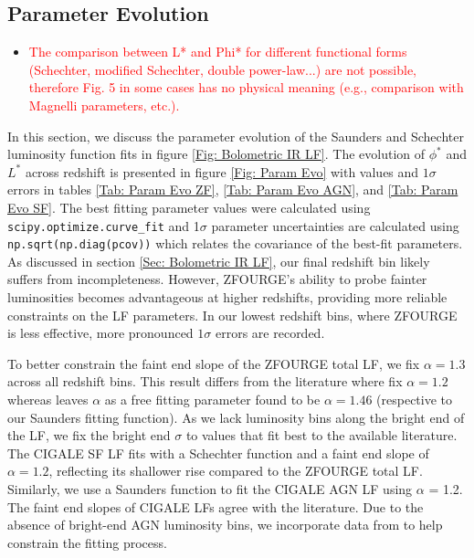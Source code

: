 \subsection{Parameter Evolution} \label{Sec: Parameter Evolution}
\begin{itemize}
    \item \textcolor{red}{The comparison between L* and Phi* for different functional forms (Schechter, modified Schechter, double power-law...) are not possible, therefore Fig. 5 in some cases has no physical meaning (e.g., comparison with Magnelli parameters, etc.).}
\end{itemize}

In this section, we discuss the parameter evolution of the Saunders and Schechter luminosity function fits in figure \ref{Fig: Bolometric IR LF}. The evolution of $\phi^{*}$ and $L^{*}$ across redshift is presented in figure \ref{Fig: Param Evo} with values and $1\sigma$ errors in tables \ref{Tab: Param Evo ZF}, \ref{Tab: Param Evo AGN}, and \ref{Tab: Param Evo SF}. The best fitting parameter values were calculated using \texttt{scipy.optimize.curve\_fit} \citep{virtanen_scipy_2020} and 1$\sigma$ parameter uncertainties are calculated using \texttt{np.sqrt(np.diag(pcov))} \citep{harris_array_2020} which relates the covariance of the best-fit parameters. As discussed in section \ref{Sec: Bolometric IR LF}, our final redshift bin likely suffers from incompleteness. However, ZFOURGE's ability to probe fainter luminosities becomes advantageous at higher redshifts, providing more reliable constraints on the LF parameters. In our lowest redshift bins, where ZFOURGE is less effective, more pronounced $1\sigma$ errors are recorded.

To better constrain the faint end slope of the ZFOURGE total LF, we fix $\alpha=1.3$ across all redshift bins. This result differs from the literature where \cite{rodighiero_mid-_2010, gruppioni_herschel_2013} fix $\alpha=1.2$ whereas \cite{fu_decomposing_2010} leaves $\alpha$ as a free fitting parameter found to be $\alpha=1.46$ (respective to our Saunders fitting function). As we lack luminosity bins along the bright end of the LF, we fix the bright end $\sigma$ to values that fit best to the available literature. The CIGALE SF LF fits with a Schechter function and a faint end slope of $\alpha=1.2$, reflecting its shallower rise compared to the ZFOURGE total LF. Similarly, we use a Saunders function to fit the CIGALE AGN LF using $\alpha$ = 1.2. The faint end slopes of CIGALE LFs agree with the literature. Due to the absence of bright-end AGN luminosity bins, we incorporate data from \cite{thorne_deep_2022} to help constrain the fitting process.

